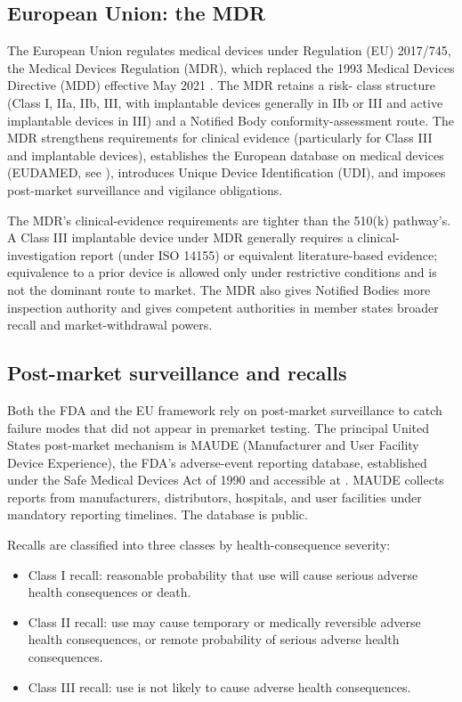 \subsection{European Union: the MDR}

The European Union regulates medical devices under Regulation
(EU) 2017/745, the Medical Devices Regulation (MDR), which
replaced the 1993 Medical Devices Directive (MDD) effective May
2021 \cite{law:v6c12-eu-mdr-2017-745}. The MDR retains a risk-
class structure (Class I, IIa, IIb, III, with implantable devices
generally in IIb or III and active implantable devices in III)
and a Notified Body conformity-assessment route. The MDR
strengthens requirements for clinical evidence (particularly for
Class III and implantable devices), establishes the European
database on medical devices (EUDAMED, see
\cite{web:v6c12-eudamed-2024}), introduces Unique Device
Identification (UDI), and imposes post-market surveillance and
vigilance obligations.

The MDR's clinical-evidence requirements are tighter than the
510(k) pathway's. A Class III implantable device under MDR
generally requires a clinical-investigation report (under ISO
14155) or equivalent literature-based evidence; equivalence to a
prior device is allowed only under restrictive conditions and is
not the dominant route to market. The MDR also gives Notified
Bodies more inspection authority and gives competent authorities
in member states broader recall and market-withdrawal powers.

\subsection{Post-market surveillance and recalls}

Both the FDA and the EU framework rely on post-market surveillance
to catch failure modes that did not appear in premarket testing.
The principal United States post-market mechanism is MAUDE
(Manufacturer and User Facility Device Experience), the FDA's
adverse-event reporting database, established under the Safe
Medical Devices Act of 1990 \cite{law:v6c12-safe-medical-devices-act-1990}
and accessible at \cite{web:v6c12-fda-maude-2024}. MAUDE collects
reports from manufacturers, distributors, hospitals, and user
facilities under mandatory reporting timelines. The database is
public.

Recalls are classified into three classes by health-consequence
severity:

\begin{itemize}[leftmargin=*]
\item Class I recall: reasonable probability that use will cause
  serious adverse health consequences or death.
\item Class II recall: use may cause temporary or medically
  reversible adverse health consequences, or remote probability of
  serious adverse health consequences.
\item Class III recall: use is not likely to cause adverse health
  consequences.
\end{itemize}

